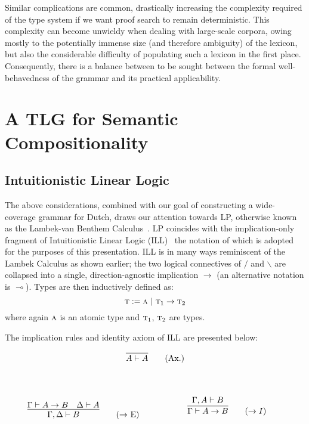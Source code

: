 Similar complications are common, drastically increasing the complexity required of the type system if we want proof search to remain deterministic.
This complexity can become unwieldy when dealing with large-scale corpora, owing mostly to the potentially immense size (and therefore ambiguity) of the lexicon, but also the considerable difficulty of populating such a lexicon in the first place.
Consequently, there is a balance between to be sought between the formal well-behavedness of the grammar and its practical applicability.



\section{A TLG for Semantic Compositionality}
\subsection{Intuitionistic Linear Logic}
The above considerations, combined with our goal of constructing a wide-coverage grammar for Dutch, draws our attention towards LP, otherwise known as the Lambek-van Benthem Calculus~\cite{van1988semantics}.
LP coincides with the implication-only fragment of Intuitionistic Linear Logic (ILL)~\cite{girard1987linear} the notation of which is adopted for the purposes of this presentation.
ILL is in many ways reminiscent of the Lambek Calculus as shown earlier; the two logical connectives of $/$ and $\backslash$ are collapsed into a single, direction-agnostic implication $\rightarrow$ (an alternative notation is $\multimap$).
Types are then inductively defined as:
\[
\textsc{t} := \textsc{a} \ | \ \textsc{t}_1 \to \textsc{t}_2 
\]
where again $\textsc{a}$ is an atomic type and $\textsc{t}_1$, $\textsc{t}_2$ are types.

The implication rules and identity axiom of ILL are presented below:

\begin{center}
\begin{minipage}{0.5\textwidth}
\[
\infer{A \vdash A}{}\tag{Ax.}
\]
\end{minipage}\\
\end{center}
\begin{align*}
    \begin{minipage}{0.5\textwidth}
	\[
        \infer{\Gamma, \Delta \vdash B}{
            \Gamma \vdash A \rightarrow B
            &
            \Delta \vdash A
        }\tag{$\rightarrow$ E}
    \]
    \end{minipage}
    \begin{minipage}{0.5\textwidth}
    \[
        \infer{\Gamma \vdash A \rightarrow B}{
            \Gamma, A \vdash B
        }\tag{$\rightarrow I$}\\
    \]
    \end{minipage}
\end{align*}


